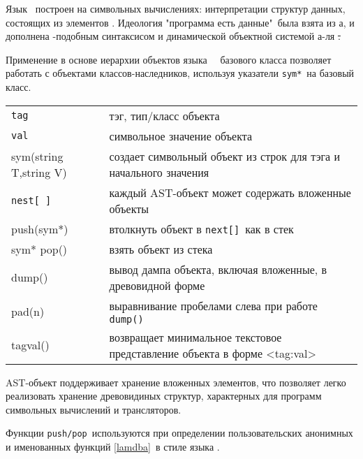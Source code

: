 \label{bisyntax}\secdown



\label{symbol}

Язык \bi\ построен на символьных вычислениях: интерпретации структур данных,
состоящих из элементов .
Идеология "программа есть данные"\ была взята из \lisp а, и дополнена
\py-подобным синтаксисом и динамической объектной системой а-ля \st.

\begin{framed}
Применение в основе иерархии объектов языка \bi\ \ базового
класса позволяет работать с объектами классов-наследников, используя указатели
\verb|sym*|\ на базовый класс. 
\end{framed}


\begin{tabular}{l l}
\verb|tag| & тэг, тип/класс объекта \\
\verb|val| & символьное значение объекта \\
sym(string T,string V) & создает символьный объект из строк для тэга
 и начального значения \\
\hline
\verb|nest[ ]| & каждый AST-объект может содержать вложенные объекты \\
push(sym*) & втолкнуть объект в \verb|next[]|\ как в стек \\
sym* pop() & взять объект из стека \\ 
\hline
dump() & вывод дампа объекта, включая вложенные, в древовидной форме \\
pad(n) & выравнивание пробелами слева при работе \verb|dump()| \\
tagval() & возвращает минимальное текстовое представление 
объекта в форме <tag:val> \\
\end{tabular}

\bigskip
AST-объект поддерживает хранение вложенных элементов, что позволяет легко
реализовать хранение древовидиных структур, характерных для программ символьных
вычислений и трансляторов. 

Функции \verb|push/pop|\ используются при определении пользовательских 
анонимных и именованных функций \ref{lamdba}\ в стиле языка \forth.  

\secdown


